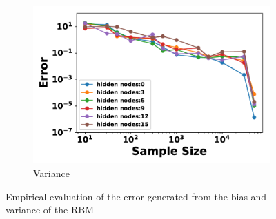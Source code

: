 \documentclass[letterpaper]{article} %
\begin{document}
\begin{figure}[t]
\begin{subfigure}[b]{0.33\textwidth}
              \includegraphics[width=\textwidth]{./RBM_Variance_Selected-eps-converted-to.pdf}
              \caption{Variance}
          \end{subfigure}
          \caption{Empirical evaluation of the error generated from the bias and variance of the RBM} \label{fig:RBM_error_plot}
        \end{figure}
\end{document}
